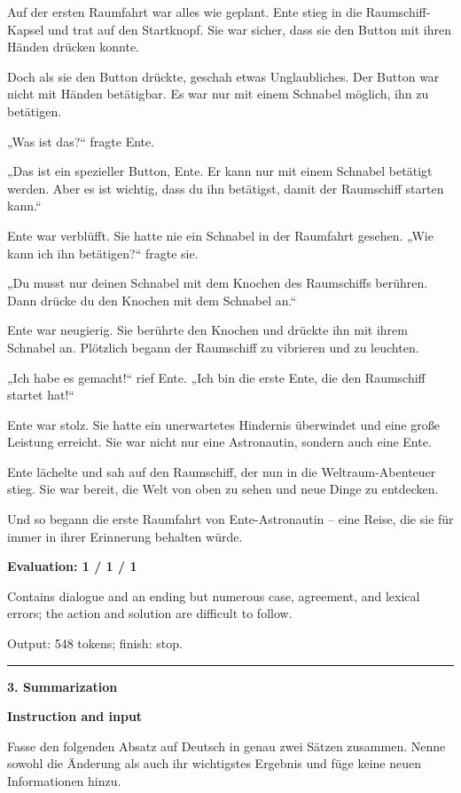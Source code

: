 \documentclass[10pt]{article}
\begin{document}
{\begin{minipage}{\textwidth}
\par\smallskip
Auf der ersten Raumfahrt war alles wie geplant. Ente stieg in die Raumschiff-Kapsel und trat auf den Startknopf. Sie war sicher, dass sie den Button mit ihren Händen drücken konnte.
\par\smallskip
Doch als sie den Button drückte, geschah etwas Unglaubliches. Der Button war nicht mit Händen betätigbar. Es war nur mit einem Schnabel möglich, ihn zu betätigen.
\par\smallskip
„Was ist das?“ fragte Ente.
\par\smallskip
„Das ist ein spezieller Button, Ente. Er kann nur mit einem Schnabel betätigt werden. Aber es ist wichtig, dass du ihn betätigst, damit der Raumschiff starten kann.“
\par\smallskip
Ente war verblüfft. Sie hatte nie ein Schnabel in der Raumfahrt gesehen. „Wie kann ich ihn betätigen?“ fragte sie.
\par\smallskip
„Du musst nur deinen Schnabel mit dem Knochen des Raumschiffs berühren. Dann drücke du den Knochen mit dem Schnabel an.“
\par\smallskip
Ente war neugierig. Sie berührte den Knochen und drückte ihn mit ihrem Schnabel an. Plötzlich begann der Raumschiff zu vibrieren und zu leuchten.
\par\smallskip
„Ich habe es gemacht!“ rief Ente. „Ich bin die erste Ente, die den Raumschiff startet hat!“
\par\smallskip
Ente war stolz. Sie hatte ein unerwartetes Hindernis überwindet und eine große Leistung erreicht. Sie war nicht nur eine Astronautin, sondern auch eine Ente.
\par\smallskip
Ente lächelte und sah auf den Raumschiff, der nun in die Weltraum-Abenteuer stieg. Sie war bereit, die Welt von oben zu sehen und neue Dinge zu entdecken.
\par\smallskip
Und so begann die erste Raumfahrt von Ente-Astronautin – eine Reise, die sie für immer in ihrer Erinnerung behalten würde.\par\smallskip
\textbf{Evaluation: 1 / 1 / 1}\par Contains dialogue and an ending but numerous case, agreement, and lexical errors; the action and solution are difficult to follow.
\par {\color{gray} Output: 548 tokens; finish: stop.}\par
\medskip\hrule\smallskip
{\bfseries 3. Summarization}\par\smallskip
\textbf{Instruction and input}\par Fasse den folgenden Absatz auf Deutsch in genau zwei Sätzen zusammen. Nenne sowohl die Änderung als auch ihr wichtigstes Ergebnis und füge keine neuen Informationen hinzu.

\end{minipage}}
\end{document}
